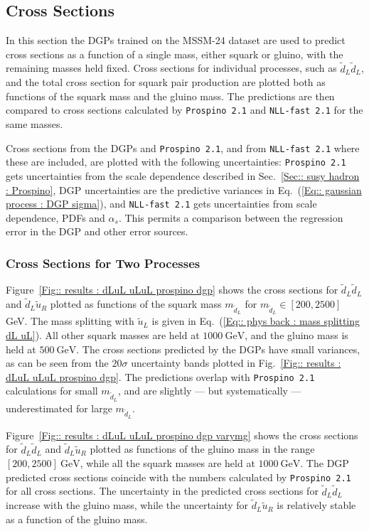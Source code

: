 \documentclass[twoside,english]{uiofysmaster}
\begin{document}
{{\subsection{Cross Sections}\label{Sec:: results : Cross Sections}

In this section the DGPs trained on the MSSM-24 dataset are used to predict cross sections as a function of a single mass, either squark or gluino, with the remaining masses held fixed. Cross sections for individual processes, such as $\widetilde{d}_L \widetilde{d}_L$, and the total cross section for squark pair production are plotted both as functions of the squark mass and the gluino mass. The predictions are then compared to cross sections calculated by \verb|Prospino 2.1| and \verb|NLL-fast 2.1| for the same masses.

Cross sections from the DGPs and \verb|Prospino 2.1|, and from \verb|NLL-fast 2.1| where these are included, are plotted with the following uncertainties: \verb|Prospino 2.1| gets uncertainties from the scale dependence described in Sec.~\ref{Sec:: susy hadron : Prospino}, DGP uncertainties are the predictive variances in Eq.~(\ref{Eq:: gaussian process : DGP sigma}), and \verb|NLL-fast 2.1| gets uncertainties from scale dependence, PDFs and $\alpha_s$. This permits a comparison between the regression error in the DGP and other error sources.

\subsubsection{Cross Sections for Two Processes}
Figure~\ref{Fig:: results : dLuL uLuL prospino dgp} shows the cross sections for $\widetilde{d}_L \widetilde{d}_L$ and $\widetilde{d}_L \widetilde{u}_R$ plotted as functions of the squark mass $m_{\widetilde{d}_L}$ for $m_{\widetilde{d}_L}\in[200, 2500]$ GeV. The mass splitting with $\widetilde{u}_L$ is given in Eq.~(\ref{Eq:: phys back : mass splitting dL uL}). All other squark masses are held at $1000~\mathrm{GeV}$, and the gluino mass is held at $500~\mathrm{GeV}$. The cross sections predicted by the DGPs have small variances, as can be seen from the $20 \sigma$ uncertainty bands plotted in Fig.~\ref{Fig:: results : dLuL uLuL prospino dgp}. The predictions overlap with \verb|Prospino 2.1| calculations for small $m_{\widetilde{d}_L}$, and are slightly --- but systematically --- underestimated for large $m_{\widetilde{d}_L}$. 

Figure~\ref{Fig:: results : dLuL uLuL prospino dgp varymg} shows the cross sections for $\widetilde{d}_L \widetilde{d}_L$ and $\widetilde{d}_L \widetilde{u}_R$ plotted as functions of the gluino mass in the range $[200, 2500]~\mathrm{GeV}$, while all the squark masses are held at $1000~\mathrm{GeV}$. The DGP predicted cross sections coincide with the numbers calculated by \verb|Prospino 2.1| for all cross sections. The uncertainty in the predicted cross sections for $\widetilde{d}_L \widetilde{d}_L$ increase with the gluino mass, while the uncertainty for $\widetilde{d}_L \widetilde{u}_R$ is relatively stable as a function of the gluino mass.  

}}
\end{document}
